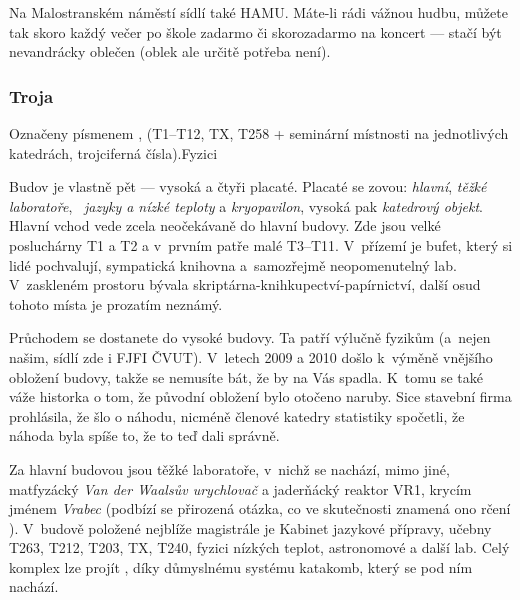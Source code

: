 Na Malostranském náměstí sídlí také HAMU. Máte-li rádi vážnou hudbu, můžete tak skoro každý večer po škole zadarmo či skorozadarmo na koncert --- stačí být nevandrácky oblečen (oblek ale určitě potřeba není).

\subsubsection{Troja}
 {Označeny písmenem ,
(T1--T12, TX, T258 + seminární místnosti na jednotlivých
katedrách,  trojciferná čísla).}{Fyzici}

Budov je vlastně pět ---  vysoká a čtyři placaté. Placaté se zovou:
\emph{hlavní}, \emph{těžké laboratoře\/}, ~\emph{jazyky a nízké
teploty} a \emph{kryopavilon}, vysoká pak \emph{katedrový objekt}.
Hlavní vchod vede zcela neočekávaně do hlavní budovy. Zde jsou
velké posluchárny T1 a T2 a v~prvním patře malé T3--T11. V~přízemí
je bufet, který si lidé pochvalují, sympatická knihovna
a~samozřejmě neopomenutelný lab. V~zaskleném prostoru bývala
skrip\-tár\-na-knih\-ku\-pec\-tví-pa\-pír\-nic\-tví, další osud tohoto místa je prozatím neznámý. 

Průchodem se
dostanete do vysoké budovy. Ta patří výlučně fyzikům (a~nejen
našim, sídlí zde i FJFI ČVUT). V~letech 2009 a 2010 došlo k~výměně
vnějšího obložení budovy, takže se nemusíte bát, že by na Vás
spadla. K~tomu se také váže historka o tom, že původní obložení bylo otočeno naruby. Sice stavební firma prohlásila, že šlo o náhodu, nicméně členové katedry statistiky spočetli, že náhoda byla spíše to, že to teď dali správně.

Za hlavní budovou jsou těžké laboratoře, v~nichž se nachází, mimo
jiné, matfyzácký {\it Van der Waalsův urychlovač\/} a jaderňácký
reaktor VR1, krycím jménem {\it Vrabec\/} (podbízí se přirozená
otázka, co ve skutečnosti znamená ono rčení ). V~budově položené nejblíže magistrále je Kabinet
jazykové přípravy, učebny T263, T212, T203, TX, T240, fyzici
nízkých teplot, astronomové a další lab.  Celý komplex lze projít
, díky důmyslnému systému katakomb, který se pod
ním nachází.
